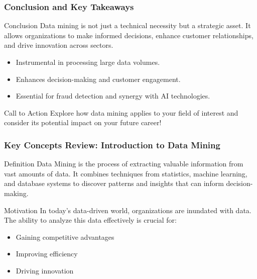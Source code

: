 \documentclass[aspectratio=169]{beamer}
\begin{document}
\begin{frame}[fragile]
    \frametitle{Conclusion and Key Takeaways}
    \begin{block}{Conclusion}
        Data mining is not just a technical necessity but a strategic asset. It allows organizations to make informed decisions, enhance customer relationships, and drive innovation across sectors.
    \end{block}
    \begin{itemize}
        \item Instrumental in processing large data volumes.
        \item Enhances decision-making and customer engagement.
        \item Essential for fraud detection and synergy with AI technologies.
    \end{itemize}
    \begin{block}{Call to Action}
        Explore how data mining applies to your field of interest and consider its potential impact on your future career!
    \end{block}
\end{frame}

\begin{frame}[fragile]
  \frametitle{Key Concepts Review: Introduction to Data Mining}
  \begin{block}{Definition}
    Data Mining is the process of extracting valuable information from vast amounts of data. It combines techniques from statistics, machine learning, and database systems to discover patterns and insights that can inform decision-making.
  \end{block}
  
  \begin{block}{Motivation}
    In today’s data-driven world, organizations are inundated with data. The ability to analyze this data effectively is crucial for:
    \begin{itemize}
      \item Gaining competitive advantages
      \item Improving efficiency
      \item Driving innovation
    \end{itemize}
  \end{block}
\end{frame}
\end{document}
